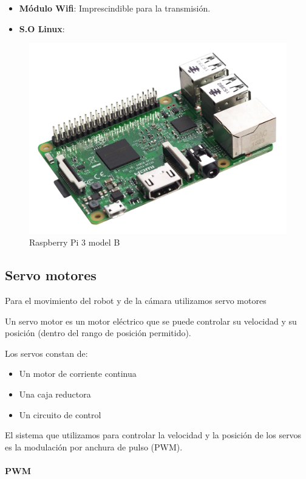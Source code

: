 \documentclass[twoside, 12pt]{epstfg}
\begin{document}
\begin{itemize}
	\item \textbf{Módulo Wifi}: Imprescindible para la transmisión.
	\item \textbf{S.O Linux}:
\end{itemize}


\begin{figure}[h]
	\centerline{
		\mbox{\includegraphics[width=.80\textwidth]{images/raspi3.jpg}}
	}
	\caption{Raspberry Pi 3 model B}
	
\end{figure}

\subsection{Servo motores}
Para el movimiento del robot y de la cámara utilizamos servo motores


Un servo motor es un motor eléctrico que se puede controlar su velocidad y su posición (dentro del rango de posición permitido).

Los servos constan de:
\begin{itemize}
	\item Un motor de corriente continua
	\item Una caja reductora
	\item Un circuito de control
\end{itemize}

El sistema que utilizamos para controlar la velocidad y la posición de los servos es la modulación por anchura de pulso (PWM).

\paragraph{PWM}
\end{document}
